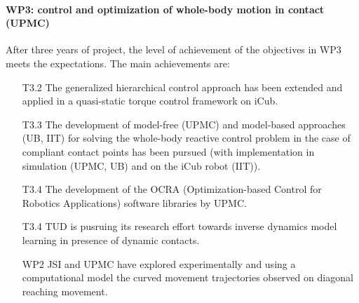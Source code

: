 

 
\paragraph*{WP3: control and optimization of whole-body motion in contact (UPMC)}

After three years of project, the level of achievement of the objectives in WP3 meets the expectations. The main achievements are:
\begin{itemize}
\item[T3.2]  The generalized hierarchical control approach has been extended and applied in a quasi-static torque control framework on iCub.

\item[T3.3]  The development of model-free (UPMC) and model-based approaches (UB, IIT) for solving the whole-body reactive control problem in the case of compliant contact points has been pursued (with implementation in simulation (UPMC, UB) and on the iCub robot (IIT)).

\item[T3.4]  The development of the OCRA (Optimization-based Control for Robotics Applications) software libraries by UPMC.

\item[T3.4]  TUD is pusruing its research effort towards inverse dynamics model learning in presence of dynamic contacts.

\item[WP2] JSI and UPMC have explored experimentally and using a computational model the curved movement trajectories observed on diagonal reaching movement.
\end{itemize}

